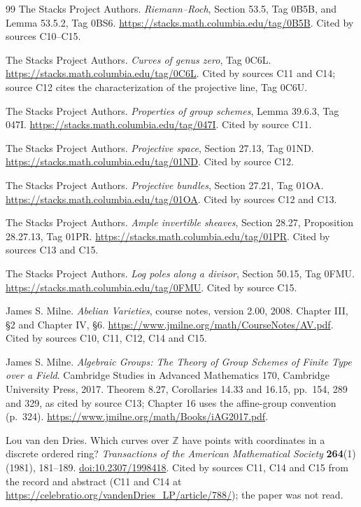 \documentclass[11pt,oneside]{article}
\numberwithin{equation}{section}
\theoremstyle{definition}
\theoremstyle{remark}
\newcommand{\Z}{\mathbb Z}
\begin{document}
\begin{thebibliography}{99}
The Stacks Project Authors.
\emph{Riemann--Roch}, Section 53.5, Tag 0B5B, and Lemma 53.5.2, Tag 0BS6.
\url{https://stacks.math.columbia.edu/tag/0B5B}. Cited by sources C10--C15.

The Stacks Project Authors.
\emph{Curves of genus zero}, Tag 0C6L.
\url{https://stacks.math.columbia.edu/tag/0C6L}. Cited by sources C11 and C14; source
C12 cites the characterization of the projective line, Tag 0C6U.

The Stacks Project Authors.
\emph{Properties of group schemes}, Lemma 39.6.3, Tag 047I.
\url{https://stacks.math.columbia.edu/tag/047I}. Cited by source C11.

The Stacks Project Authors.
\emph{Projective space}, Section 27.13, Tag 01ND.
\url{https://stacks.math.columbia.edu/tag/01ND}. Cited by source C12.

The Stacks Project Authors.
\emph{Projective bundles}, Section 27.21, Tag 01OA.
\url{https://stacks.math.columbia.edu/tag/01OA}. Cited by sources C12 and C13.

The Stacks Project Authors.
\emph{Ample invertible sheaves}, Section 28.27, Proposition 28.27.13, Tag 01PR.
\url{https://stacks.math.columbia.edu/tag/01PR}. Cited by sources C13 and C15.

The Stacks Project Authors.
\emph{Log poles along a divisor}, Section 50.15, Tag 0FMU.
\url{https://stacks.math.columbia.edu/tag/0FMU}. Cited by source C15.

James S. Milne.
\emph{Abelian Varieties}, course notes, version 2.00, 2008. Chapter III, \S2 and
Chapter IV, \S6. \url{https://www.jmilne.org/math/CourseNotes/AV.pdf}. Cited by
sources C10, C11, C12, C14 and C15.

James S. Milne.
\emph{Algebraic Groups: The Theory of Group Schemes of Finite Type over a Field}.
Cambridge Studies in Advanced Mathematics 170, Cambridge University Press, 2017.
Theorem 8.27, Corollaries 14.33 and 16.15, pp.~154, 289 and 329,
as cited by source C13; Chapter 16 uses the affine-group convention (p.~324).
\url{https://www.jmilne.org/math/Books/iAG2017.pdf}.

Lou van den Dries.
Which curves over $\Z$ have points with coordinates in a discrete ordered ring?
\emph{Transactions of the American Mathematical Society} \textbf{264}(1) (1981),
181--189. \href{https://doi.org/10.2307/1998418}{doi:10.2307/1998418}. Cited by
sources C11, C14 and C15 from the record and abstract (C11 and C14 at
\url{https://celebratio.org/vandenDries_LP/article/788/}); the paper was not read.


\end{thebibliography}
\end{document}

